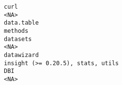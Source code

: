 \documentclass[
  letterpaper,
  DIV=11,
  numbers=noendperiod]{scrreprt}
\begin{document}
\begin{verbatim}
curl                                                                                                                                                                                                                                                                                                                                                                                                                                                                                                                                                                                                                  <NA>
data.table                                                                                                                                                                                                                                                                                                                                                                                                                                                                                                                                                                                                         methods
datasets                                                                                                                                                                                                                                                                                                                                                                                                                                                                                                                                                                                                              <NA>
datawizard                                                                                                                                                                                                                                                                                                                                                                                                                                                                                                                                                                               insight (>= 0.20.5), stats, utils
DBI                                                                                                                                                                                                                                                                                                                                                                                                                                                                                                                                                                                                                   <NA>

\end{verbatim}
\end{document}
